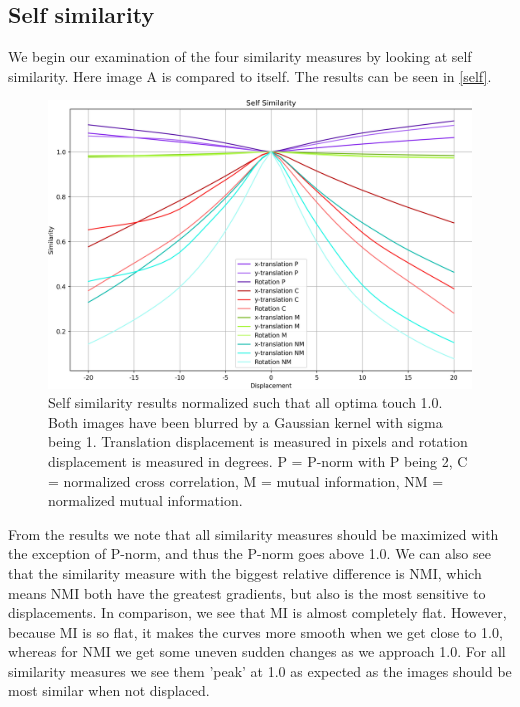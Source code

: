 \subsection{Self similarity}
We begin our examination of the four similarity measures by looking at self similarity. Here image A is compared to itself. The results can be seen in \autoref{self}.

\begin{figure}[h]
	\centering
	\includegraphics[width=0.8\linewidth]{Materials/selfSimilarity}
	\caption{Self similarity results normalized such that all optima touch 1.0. Both images have been blurred by a Gaussian kernel with sigma being 1. Translation displacement is measured in pixels and rotation displacement is measured in degrees. P = P-norm with P being 2, C = normalized cross correlation, M = mutual information, NM = normalized mutual information.}
	\label{self}
\end{figure}
From the results we note that all similarity measures should be maximized with the exception of P-norm, and thus the P-norm goes above 1.0. We can also see that the similarity measure with the biggest relative difference is NMI, which means NMI both have the greatest gradients, but also is the most sensitive to displacements. In comparison, we see that MI is almost completely flat. However, because MI is so flat, it makes the curves more smooth when we get close to 1.0, whereas for NMI we get some uneven sudden changes as we approach 1.0. For all similarity measures we see them 'peak' at 1.0 as expected as the images should be most similar when not displaced. 